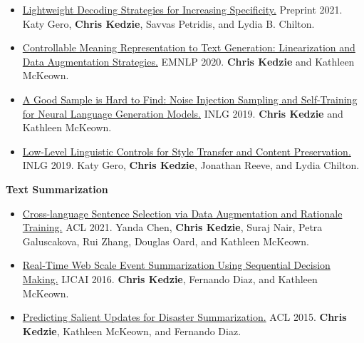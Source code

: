 \documentclass[letterpaper,11pt]{article}
\begin{document}
\begin{itemize}[leftmargin=6.0mm]
\item \href{https://arxiv.org/pdf/2110.11850.pdf}{Lightweight Decoding Strategies for Increasing Specificity.} Preprint 2021.
Katy Gero, \textbf{Chris Kedzie}, Savvas Petridis, and Lydia B. Chilton.

\item \href{http://www.cs.columbia.edu/~kedzie/cmrttg.pdf}{Controllable Meaning Representation to Text Generation: Linearization and Data Augmentation Strategies.} EMNLP 2020.
\textbf{Chris Kedzie} and Kathleen McKeown.

\item \href{https://www.aclweb.org/anthology/W19-8672.pdf}{A Good Sample is Hard to Find: Noise Injection Sampling and Self-Training for Neural Language Generation Models.} INLG 2019.
\textbf{Chris Kedzie} and Kathleen McKeown.


\item \href{https://www.aclweb.org/anthology/W19-8628.pdf}{Low-Level Linguistic Controls for Style Transfer and Content Preservation.} INLG 2019.
Katy Gero, \textbf{Chris Kedzie}, Jonathan Reeve, and Lydia Chilton.

\end{itemize}

\textbf{Text Summarization} \\

\begin{itemize}[leftmargin=6.0mm]
\item \href{https://aclanthology.org/2021.acl-long.300.pdf}{Cross-language Sentence Selection via Data Augmentation and Rationale Training.} ACL 2021.
Yanda Chen, \textbf{Chris Kedzie}, Suraj Nair, Petra Galuscakova, Rui Zhang, Douglas Oard, and Kathleen McKeown.

\item \href{https://www.ijcai.org/Proceedings/16/Papers/528.pdf}{Real-Time Web Scale Event Summarization Using Sequential Decision Making.} IJCAI 2016.
\textbf{Chris Kedzie}, Fernando Diaz, and Kathleen McKeown.


\item \href{https://www.aclweb.org/anthology/P15-1155.pdf}{Predicting Salient Updates for Disaster Summarization.} ACL 2015.
\textbf{Chris Kedzie}, Kathleen McKeown, and Fernando Diaz.

\end{itemize}
\end{document}
